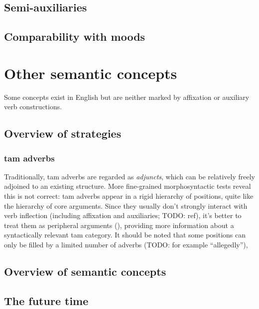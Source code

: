 \documentclass[UTF8, a4paper, oneside, scheme=plain]{ctexrep}
\newcommand*{\term}[1]{\emph{#1}}
\begin{document}
\subsection{Semi-auxiliaries}\label{sec:semi-auxiliary}

\subsection{Comparability with moods}\label{sec:tam-mood-compatibility}


\section{Other semantic concepts}

Some concepts exist in English but are neither marked by affixation or auxiliary verb constructions.

\subsection{Overview of strategies}

\subsubsection{\acs{tam} adverbs}\label{sec:tam.adverbs}

Traditionally, \acs{tam} adverbs are regarded as \term{adjuncts},
which can be relatively freely adjoined to an existing structure.
More fine-grained morphosyntactic tests reveal this is not correct:
\acs{tam} adverbs appear in a rigid hierarchy of positions, 
quite like the hierarchy of core arguments.
Since they usually don't strongly interact with verb inflection
(including affixation and auxiliaries; TODO: ref),
it's better to treat them as peripheral arguments (),
providing more information about a syntactically relevant \acs{tam} category.
It should be noted that some positions can only be filled by a limited number of adverbs (TODO: for example ``allegedly''),

\subsection{Overview of semantic concepts}

\subsection{The future time}\label{sec:future}
\end{document}
